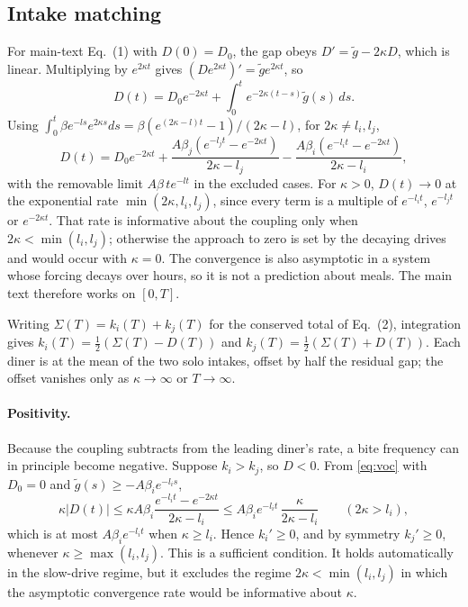\documentclass[12pt]{article}
\theoremstyle{definition}
\newcommand{\ki}{k_i}
\newcommand{\kj}{k_j}
\newcommand{\gt}{\tilde{g}}
\begin{document}
\subsection{Intake matching}

For main-text Eq.~(1) with $D(0)=D_0$, the gap obeys $D'=\gt-2\kappa D$,
which is linear. Multiplying by $e^{2\kappa t}$ gives
$(De^{2\kappa t})'=\gt e^{2\kappa t}$, so
\begin{equation}\label{eq:voc}
D(t)=D_0e^{-2\kappa t}+\int_0^t e^{-2\kappa(t-s)}\gt(s)\,ds .
\end{equation}
Using $\int_0^t\beta e^{-ls}e^{2\kappa s}ds=\beta(e^{(2\kappa-l)t}-1)/(2\kappa-l)$,
for $2\kappa\neq l_i,l_j$,
\begin{equation}\label{eq:solution}
D(t)=D_0 e^{-2\kappa t}
+\frac{A\beta_j(e^{-l_j t}-e^{-2\kappa t})}{2\kappa-l_j}
-\frac{A\beta_i(e^{-l_i t}-e^{-2\kappa t})}{2\kappa-l_i},
\end{equation}
with the removable limit $A\beta\,te^{-lt}$ in the excluded cases. For $\kappa>0$,
$D(t)\to0$ at the exponential rate $\min(2\kappa,l_i,l_j)$, since every term is a
multiple of $e^{-l_it}$, $e^{-l_jt}$ or $e^{-2\kappa t}$. That rate is informative
about the coupling only when $2\kappa<\min(l_i,l_j)$; otherwise the approach to zero
is set by the decaying drives and would occur with $\kappa=0$. The convergence is
also asymptotic in a system whose forcing decays over hours, so it is not a
prediction about meals. The main text therefore works on $[0,T]$.

Writing $\Sigma(T)=\ki(T)+\kj(T)$ for the conserved total of Eq.~(2), integration
gives $\ki(T)=\tfrac12(\Sigma(T)-D(T))$ and $\kj(T)=\tfrac12(\Sigma(T)+D(T))$. Each
diner is at the mean of the two solo intakes, offset by half the residual gap; the
offset vanishes only as $\kappa\to\infty$ or $T\to\infty$.

\paragraph{Positivity.} Because the coupling subtracts from the leading diner's
rate, a bite frequency can in principle become negative. Suppose $\ki>\kj$, so
$D<0$. From \eqref{eq:voc} with $D_0=0$ and
$\gt(s)\geq-A\beta_ie^{-l_is}$,
\[
\kappa|D(t)|\le \kappa A\beta_i\frac{e^{-l_it}-e^{-2\kappa t}}{2\kappa-l_i}
\le A\beta_ie^{-l_it}\,\frac{\kappa}{2\kappa-l_i}\qquad(2\kappa>l_i),
\]
which is at most $A\beta_ie^{-l_it}$ when $\kappa\ge l_i$. Hence $\ki'\ge0$, and by
symmetry $\kj'\ge0$, whenever $\kappa\ge\max(l_i,l_j)$. This is a sufficient
condition. It holds automatically in the slow-drive regime, but it excludes the
regime $2\kappa<\min(l_i,l_j)$ in which the asymptotic convergence rate would be
informative about $\kappa$.
\end{document}
